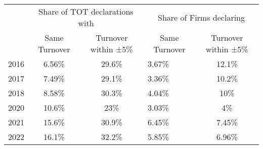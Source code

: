 \begin{tabular}[t]{lcclc}
\toprule
& \multicolumn{2}{c}{Share of TOT declarations with} & \multicolumn{2}{c}{Share of Firms declaring} \\
\cmidrule(lr){2-3} \cmidrule(lr){4-5}
& \multicolumn{1}{c}{Same Turnover} & \multicolumn{1}{c}{Turnover within ±5\%} & \multicolumn{1}{c}{Same Turnover} & \multicolumn{1}{c}{Turnover within ±5\%} \\
\midrule
2016 & 6.56\% & 29.6\% & 3.67\% & 12.1\%\\
2017 & 7.49\% & 29.1\% & 3.36\% & 10.2\%\\
2018 & 8.58\% & 30.3\% & 4.04\% & 10\%\\
2020 & 10.6\% & 23\% & 3.03\% & 4\%\\
2021 & 15.6\% & 30.9\% & 6.45\% & 7.45\%\\
2022 & 16.1\% & 32.2\% & 5.85\% & 6.96\%\\
\bottomrule
\end{tabular}
